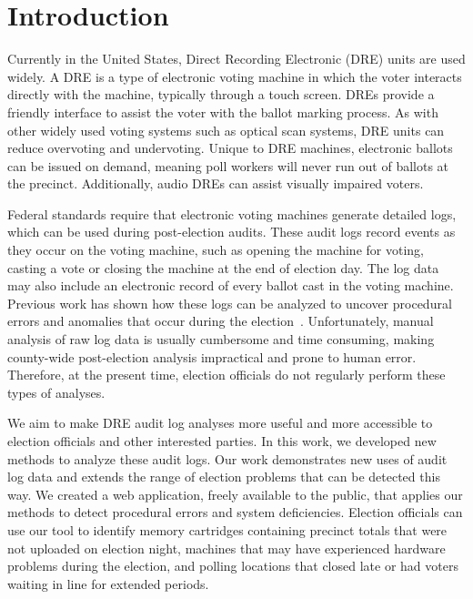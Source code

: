 \section{Introduction}

Currently in the United States, Direct Recording Electronic (DRE) units are used widely. A DRE is a type of electronic voting machine in which the voter interacts directly with the machine, typically through a touch screen. DREs provide a friendly interface to assist the voter with the ballot marking process. As with other widely used voting systems such as optical scan systems, DRE units can reduce overvoting and undervoting. Unique to DRE machines, electronic ballots can be issued on demand, meaning poll workers will never run out of ballots at the precinct.  Additionally, audio DREs can assist visually impaired voters.
 
Federal standards require that electronic voting machines generate detailed logs, which can be used during post-election audits. These audit logs record events as they occur on the voting machine, such as opening the machine for voting, casting a vote or closing the machine at the end of election day. The log data may also include an electronic record of every ballot cast in the voting machine.  Previous work has shown how these logs can be analyzed to uncover procedural errors and anomalies that occur during the election~\cite{Buell2011}.  Unfortunately, manual analysis of raw log data is usually cumbersome and time consuming, making county-wide post-election analysis impractical and prone to human error. Therefore, at the present time, election officials do not regularly perform these types of analyses. 

We aim to make DRE audit log analyses more useful and more accessible to election officials and other interested parties. In this work, we developed new methods to analyze these audit logs. Our work demonstrates new uses of audit log data and extends the range of election problems that can be detected this way. We created a web application, freely available to the public, that applies our methods to detect procedural errors and system deficiencies.  Election officials can use our tool to identify memory cartridges containing precinct totals that were not uploaded on election night, machines that may have experienced hardware problems during the election, and polling locations that closed late or had voters waiting in line for extended periods.
 

